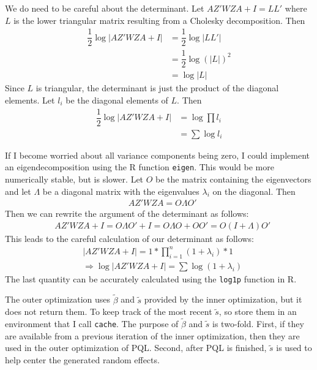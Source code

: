 \documentclass{article}
\begin{document}
We do need to be careful about the determinant. Let $AZ' W ZA +I= LL'$ where $L$ is the lower triangular matrix resulting from a Cholesky decomposition. Then
\begin{align}
\dfrac{1}{2} \log | AZ' W ZA +I | &= \dfrac{1}{2} \log |LL'|\\
&=\dfrac{1}{2} \log (|L|)^2 \\
&= \log |L|
\end{align}
Since $L$ is triangular, the determinant is just the product of the diagonal elements. Let $l_i$ be the diagonal elements of $L$. Then
\begin{align}
\dfrac{1}{2} \log | AZ' W ZA +I | &= \log \prod l_i \\
&= \sum \log l_i
\end{align}

 If I become worried about all variance components being zero, I could implement an eigendecomposition using the R function \texttt{eigen}. This would be more numerically stable, but is slower. Let $O$ be the matrix containing the eigenvectors and let $\Lambda$ be a diagonal matrix with the eigenvalues $\lambda_i$ on the diagonal. Then
\begin{align}
 &AZ' W ZA = O \Lambda O' 
\end{align}
Then we can rewrite the argument of the determinant as follows:
\begin{align}
& AZ' W ZA +I  = O \Lambda O' + I = O \Lambda O + OO'=O (I+\Lambda) O' 
\end{align}
This leads to the careful calculation of our determinant as follows:
\begin{align}
&   \left| AZ' W ZA +I \right| = 1 *  \prod_{i=1}^n (1+\lambda_i) *1\\
&\Rightarrow \log   | AZ' W ZA +I | = \sum \log(1+\lambda_i) 
\end{align}
The last quantity can be accurately calculated using the \texttt{log1p} function in R.

The outer optimization  uses $\tilde{\beta}$ and $\tilde{s}$ provided by the inner optimization, but it does not return them. To keep track of the most recent  $\tilde{s}$, so store them in an environment that I call \texttt{cache}.  The purpose of  $\tilde{\beta}$ and $\tilde{s}$ is two-fold. First, if they are available from a previous iteration of the inner optimization, then they are used in the outer optimization of PQL.  Second, after PQL is finished, $\tilde{s}$ is used to help center the generated random effects.
\end{document}
